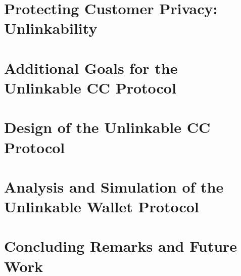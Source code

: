 \documentclass[12pt]{report}
\begin{document}
\chapter{Protecting Customer Privacy: Unlinkability}
\label{cha:unlinkability}




\chapter{Additional Goals for the Unlinkable CC Protocol}
\label{cha:unlinkable_goals}






\chapter{Design of the Unlinkable CC Protocol}
\label{cha:unlinkable_design}






\chapter{Analysis and Simulation of the Unlinkable Wallet Protocol}
\label{cha:simulation}




\chapter{Concluding Remarks and Future Work}
\label{cha:conclusion}




\printindex

\begin{vita}

\end{vita}
\end{document}
